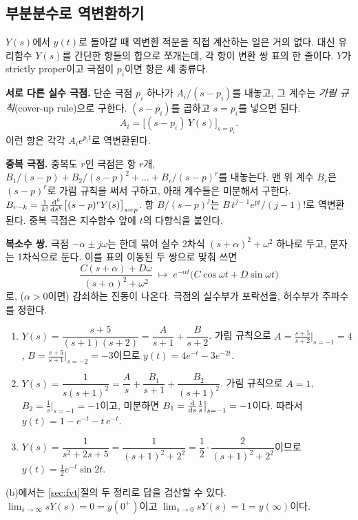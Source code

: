 \documentclass[11pt]{article}
\begin{document}
\subsection{부분분수로 역변환하기}\label{sec:pfe}
$Y(s)$에서 $y(t)$로 돌아갈 때 역변환 적분을 직접 계산하는 일은 거의 없다. 대신
유리함수 $Y(s)$를 간단한 항들의 합으로 쪼개는데, 각 항이 변환 쌍 표의 한 줄이다.
$Y$가 strictly proper이고 극점이 $p_i$이면 항은 세 종류다.

\smallskip\noindent\textbf{서로 다른 실수 극점.} 단순 극점 $p_i$ 하나가
$A_i/(s-p_i)$를 내놓고, 그 계수는 \emph{가림 규칙}(cover-up rule)으로 구한다.
$(s-p_i)$를 곱하고 $s=p_i$를 넣으면 된다.
\begin{equation}\label{eq:coverup}
   A_i = \bigl[(s-p_i)\,Y(s)\bigr]_{s=p_i} .
\end{equation}
이런 항은 각각 $A_i e^{p_i t}$로 역변환된다.

\smallskip\noindent\textbf{중복 극점.} 중복도 $r$인 극점은 항 $r$개,
$B_1/(s-p)+B_2/(s-p)^{2}+\dots+B_r/(s-p)^{r}$를 내놓는다. 맨 위 계수 $B_r$은
$(s-p)^{r}$로 가림 규칙을 써서 구하고, 아래 계수들은 미분해서 구한다.
$B_{r-k} = \frac{1}{k!}\frac{\mathrm{d}^{k}}{\mathrm{d} s^{k}}
\bigl[(s-p)^{r}Y(s)\bigr]_{s=p}$. 항 $B/(s-p)^{j}$는
$B\,t^{j-1}e^{pt}/(j-1)!$로 역변환된다. 중복 극점은 지수함수 앞에 $t$의 다항식을
붙인다.

\smallskip\noindent\textbf{복소수 쌍.} 극점 $-\alpha\pm j\omega$는 한데 묶어
실수 2차식 $(s+\alpha)^{2}+\omega^{2}$ 하나로 두고, 분자는 1차식으로 둔다. 이를
표의 이동된 두 쌍으로 맞춰 쓰면
\[
   \frac{C(s+\alpha)+D\omega}{(s+\alpha)^{2}+\omega^{2}}
   \;\longmapsto\;
   e^{-\alpha t}\bigl(C\cos\omega t + D\sin\omega t\bigr)
\]
로, ($\alpha>0$이면) 감쇠하는 진동이 나온다. 극점의 실수부가 포락선을, 허수부가
주파수를 정한다.

\begin{example}[세 경우]\label{ex:pfe}
\begin{enumerate}[label=(\alph*),itemsep=3pt,leftmargin=*]
\item $Y(s)=\dfrac{s+5}{(s+1)(s+2)}=\dfrac{A}{s+1}+\dfrac{B}{s+2}$. 가림 규칙으로
$A=\frac{s+5}{s+2}\big|_{s=-1}=4$, $B=\frac{s+5}{s+1}\big|_{s=-2}=-3$이므로
$y(t)=4e^{-t}-3e^{-2t}$.
\item $Y(s)=\dfrac{1}{s(s+1)^{2}}=\dfrac{A}{s}+\dfrac{B_1}{s+1}+\dfrac{B_2}{(s+1)^{2}}$.
가림 규칙으로 $A=1$, $B_2=\frac1s\big|_{s=-1}=-1$이고, 미분하면
$B_1=\frac{\mathrm{d}}{\mathrm{d} s}\frac1s\big|_{s=-1}=-1$이다. 따라서
$y(t)=1-e^{-t}-t\,e^{-t}$.
\item $Y(s)=\dfrac{1}{s^{2}+2s+5}=\dfrac{1}{(s+1)^{2}+2^{2}}
=\dfrac12\cdot\dfrac{2}{(s+1)^{2}+2^{2}}$이므로 $y(t)=\tfrac12e^{-t}\sin 2t$.
\end{enumerate}
(b)에서는 \ref{sec:fvt}절의 두 정리로 답을 검산할 수 있다.
$\lim_{s\to\infty}sY(s)=0=y(0^{+})$이고 $\lim_{s\to0}sY(s)=1=y(\infty)$이다.
\end{example}
\end{document}
